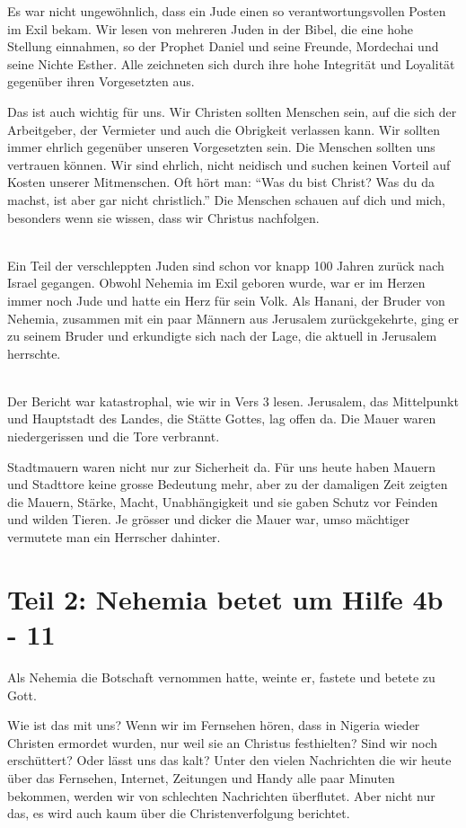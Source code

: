 \documentclass[fontsize=16pt]{mybib}
\begin{document}
Es war nicht ungewöhnlich, dass ein Jude einen so verantwortungsvollen Posten im Exil bekam. Wir lesen von mehreren Juden in der Bibel, die eine hohe Stellung einnahmen, so der Prophet Daniel und seine Freunde, Mordechai und seine Nichte Esther. Alle zeichneten sich durch ihre hohe Integrität und Loyalität gegenüber ihren Vorgesetzten aus.

Das ist auch wichtig für uns. Wir Christen sollten Menschen sein, auf die sich der Arbeitgeber, der Vermieter und auch die Obrigkeit verlassen kann. Wir sollten immer ehrlich gegenüber unseren Vorgesetzten sein. Die Menschen sollten uns vertrauen können. Wir sind ehrlich, nicht neidisch und suchen keinen Vorteil auf Kosten unserer Mitmenschen. Oft hört man: \enquote{Was du bist Christ? Was du da machst, ist aber gar nicht christlich.} Die Menschen schauen auf dich und mich, besonders wenn sie wissen, dass wir Christus nachfolgen.

\\
Ein Teil der verschleppten Juden sind schon vor knapp 100 Jahren zurück nach Israel gegangen. Obwohl Nehemia im Exil geboren wurde, war er im Herzen immer noch Jude und hatte ein Herz für sein Volk.  Als Hanani, der Bruder von Nehemia, zusammen mit ein paar Männern aus Jerusalem zurückgekehrte, ging er zu seinem Bruder und erkundigte sich nach der Lage, die aktuell in Jerusalem herrschte.

\\
Der Bericht war katastrophal, wie wir in Vers 3 lesen. Jerusalem, das Mittelpunkt und Hauptstadt des Landes, die Stätte Gottes, lag offen da. Die Mauer waren niedergerissen und die Tore verbrannt.

Stadtmauern waren nicht nur zur Sicherheit da. Für uns heute haben Mauern und Stadttore keine grosse Bedeutung mehr, aber zu der damaligen Zeit zeigten die Mauern, Stärke, Macht, Unabhängigkeit und sie gaben Schutz vor Feinden und wilden Tieren. Je grösser und dicker die Mauer war, umso mächtiger vermutete man ein Herrscher dahinter.

\section{Teil 2: Nehemia betet um Hilfe 4b - 11}


Als Nehemia die Botschaft vernommen hatte, weinte er, fastete und betete zu Gott.

Wie ist das mit uns? Wenn wir im Fernsehen hören, dass in Nigeria wieder Christen ermordet wurden, nur weil sie an Christus festhielten? Sind wir noch erschüttert? Oder lässt uns das kalt? Unter den vielen Nachrichten die wir heute über das Fernsehen, Internet, Zeitungen und Handy alle paar Minuten bekommen, werden wir von schlechten Nachrichten überflutet. Aber nicht nur das, es wird auch kaum über die Christenverfolgung berichtet.
\end{document}
